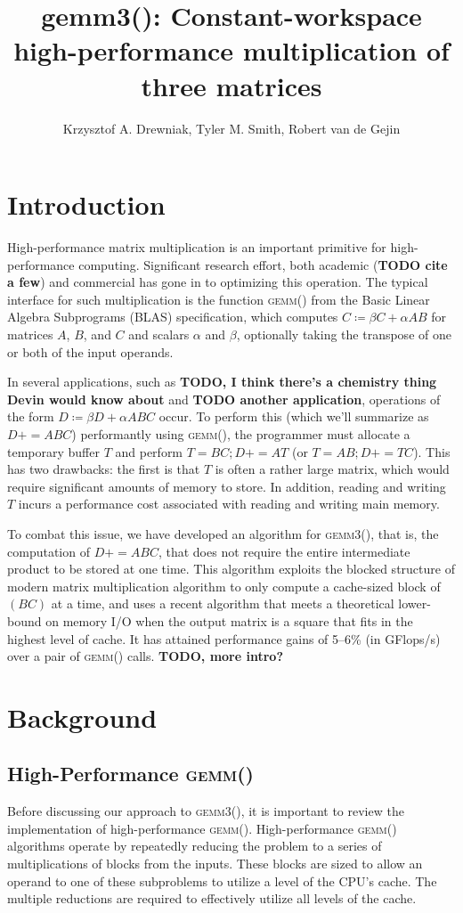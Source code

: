 \documentclass[12pt]{article}
\title{gemm3(): Constant-workspace high-performance multiplication of three matrices}
\author{Krzysztof A. Drewniak, Tyler M. Smith, Robert van de Gejin}
\newcommand*{\pluseq}{\mathrel{{+}{=}}}
\newcommand*{\gemmt}{{\textsc{gemm3()}}}
\newcommand*{\gemm}{{\textsc{gemm()}}}
\begin{document}
\maketitle{}
\section{Introduction}
High-performance matrix multiplication is an important primitive for high-performance computing.
Significant research effort, both academic (\textbf{TODO cite a few}) and commercial has gone in to optimizing this operation.
The typical interface for such multiplication is the function \gemm{} from the Basic Linear Algebra Subprograms (BLAS) specification, which computes $C \coloneqq \beta C + \alpha AB$ for matrices $A$, $B$, and $C$ and scalars $\alpha$ and $\beta$, optionally taking the transpose of one or both of the input operands.

In several applications, such as \textbf{TODO, I think there's a chemistry thing Devin would know about} and \textbf{TODO another application}, operations of the form $D \coloneqq \beta D + \alpha ABC$ occur.
To perform this (which we'll summarize as $D \pluseq ABC$) performantly using \gemm{}, the programmer must allocate a temporary buffer $T$ and perform $T = BC; D \pluseq AT$ (or $T = AB; D \pluseq TC$).
This has two drawbacks: the first is that $T$ is often a rather large matrix, which would require significant amounts of memory to store.
In addition, reading and writing $T$ incurs a performance cost associated with reading and writing main memory.

To combat this issue, we have developed an algorithm for \gemmt{}, that is, the computation of $D \pluseq ABC$, that does not require the entire intermediate product to be stored at one time.
This algorithm exploits the blocked structure of modern matrix multiplication algorithm to only compute a cache-sized block of $(BC)$ at a time, and uses a recent algorithm that meets a theoretical lower-bound on memory I/O when the output matrix is a square that fits in the highest level of cache\cite{Smith2017}.
It has attained performance gains of 5--6\% (in GFlops/s) over a pair of \gemm{} calls. \textbf{TODO, more intro?}

\section{Background}
\subsection{High-Performance \gemm{}}
Before discussing our approach to \gemmt{}, it is important to review the implementation of high-performance \gemm{}.
High-performance \gemm{} algorithms operate by repeatedly reducing the problem to a series of multiplications of blocks from the inputs.
These blocks are sized to allow an operand to one of these subproblems to utilize a level of the CPU's cache.
The multiple reductions are required to effectively utilize all levels of the cache.
\end{document}
